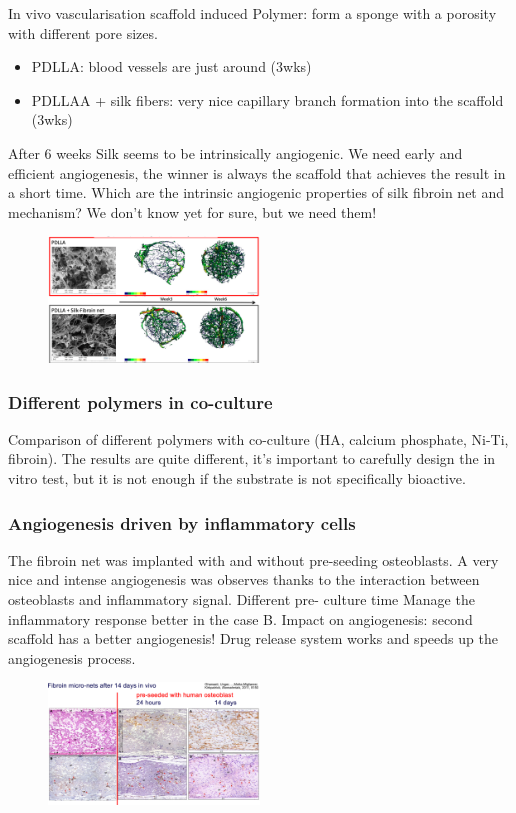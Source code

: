 In vivo vascularisation scaffold induced
Polymer: form a sponge with a porosity with different pore sizes.
\begin{itemize}
\item PDLLA: blood vessels are just around (3wks)
\item PDLLAA + silk fibers: very nice capillary branch formation into the scaffold (3wks)
\end{itemize}
After 6 weeks Silk seems to be intrinsically angiogenic.
We need early and efficient angiogenesis, the winner is always the scaffold that achieves the result in a short time. Which are the intrinsic angiogenic properties of silk fibroin net and mechanism? We don’t know yet for sure, but we need them!

\begin{figure}[h]
\centering
\includegraphics[width=0.5\textwidth]{pdlla}
\caption{\label{fig:pdlla}}
\end{figure}

\subsubsection{Different polymers in co-culture}
Comparison of different polymers with co-culture (HA, calcium phosphate, Ni-Ti, fibroin). The results are quite different, it’s important to carefully design the in vitro test, but it is not enough if the substrate is not specifically bioactive.

\subsubsection{Angiogenesis driven by inflammatory cells}
The fibroin net was implanted with and without pre-seeding osteoblasts. A very nice and intense angiogenesis was observes thanks to the interaction between osteoblasts and inflammatory signal.
Different pre- culture time
Manage the inflammatory response better in the case B.
Impact on angiogenesis: second scaffold has a better angiogenesis!
Drug release system works and speeds up the angiogenesis process.

\begin{figure}[h]
\centering
\includegraphics[width=0.5\textwidth]{fibroin}
\caption{\label{fig:fibroin}}
\end{figure}

